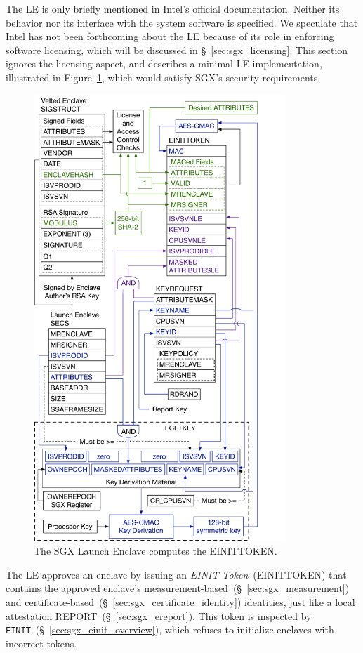 The LE is only briefly mentioned in Intel's official documentation. Neither its
behavior nor its interface with the system software is specified. We speculate
that Intel has not been forthcoming about the LE because of its role in
enforcing software licensing, which will be discussed in
\S~\ref{sec:sgx_licensing}. This section ignores the licensing aspect, and
describes a minimal LE implementation, illustrated in
Figure~\ref{fig:sgx_einittoken}, which would satisfy SGX's security
requirements.

\begin{figure}[hbt!]
  \centering
  \includegraphics[width=95mm]{figures/sgx_einittoken.pdf}
  \caption{
    The SGX Launch Enclave computes the EINITTOKEN.
  }
  \label{fig:sgx_einittoken}
\end{figure}


The LE approves an enclave by issuing an \textit{EINIT Token}~(EINITTOKEN) that
contains the approved enclave's
measurement-based~(\S~\ref{sec:sgx_measurement})
and certificate-based~(\S~\ref{sec:sgx_certificate_identity}) identities, just
like a local attestation REPORT~(\S~\ref{sec:sgx_ereport}). This token is
inspected by \texttt{EINIT}~(\S~\ref{sec:sgx_einit_overview}), which refuses to
initialize enclaves with incorrect tokens.

